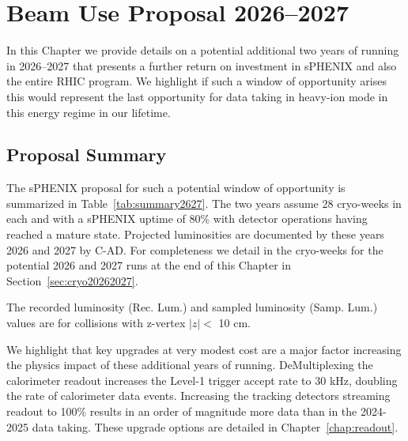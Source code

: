 \chapter{Beam Use Proposal 2026--2027}
\label{chap:beam_use_proposal_extra}

In this Chapter we provide details on a potential additional two years of running in 2026--2027 that presents a further return on investment in sPHENIX and also the entire RHIC program.   We highlight if such a window of opportunity arises this would represent the last opportunity for data taking in heavy-ion mode in this energy regime in our lifetime. 

\section{Proposal Summary}

The sPHENIX proposal for such a potential window of opportunity is summarized in Table~\ref{tab:summary2627}.   The two years assume 28 cryo-weeks in each and with a sPHENIX uptime of 80\% with detector operations having reached a mature state.   Projected luminosities are documented by these years 2026 and 2027 by C-AD.  For completeness we detail in the cryo-weeks for the potential 2026 and 2027 runs at the end of this Chapter in Section~\ref{sec:cryo20262027}.

\begin{table}[h!]
\centering
\caption{The recorded luminosity (Rec. Lum.) and sampled luminosity (Samp. Lum.) values are for collisions with z-vertex $|z|<$ 10 cm.  \label{tab:summary2627}}
\bigskip
\centering

\end{table}

We highlight that key upgrades at very modest cost are a major factor increasing the physics impact of these additional years of running.   DeMultiplexing the calorimeter readout increases the Level-1 trigger accept rate to 30 kHz, doubling the rate of calorimeter data events.    Increasing the tracking detectors streaming readout to 100\% results in an order of magnitude more data than in the 2024-2025 data taking.    These upgrade options are detailed in Chapter~\ref{chap:readout}.


